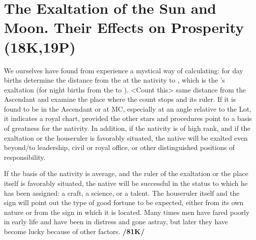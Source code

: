 \section{The Exaltation of the Sun and Moon. Their Effects on Prosperity (18K,19P)}
We ourselves have found from experience a mystical way of calculating: for day births determine the distance from the \Sun\xspace at the nativity to \Aries, which is the \Sun’s exaltation (for night births from the \Moon\xspace to \Taurus). <Count this> same distance from the Ascendant and examine the place where the count stops and its ruler. If it is found to be in the Ascendant or at MC, especially at an angle relative to the Lot, it
indicates a royal chart, provided the other stars and procedures point to a basis of greatness for the nativity. In addition, if the nativity is of high rank, and if the exaltation or the houseruler is favorably situated, the native will be exalted even beyond/to leadership, civil or royal office, or other distinguished positions of responsibility. 

If the basis of the nativity is average, and the ruler of the exaltation or the place itself is favorably situated, the native will be successful in the status to which he has been assigned: a craft, a science, or a talent. The houseruler itself and the sign will point out the type of good fortune to be expected, either from its own nature or from the sign in which it is located. Many times men have fared poorly in early life and have been in distress and gone astray, but later they have become lucky because of other factors. \textbf{/81K/}

\newpage